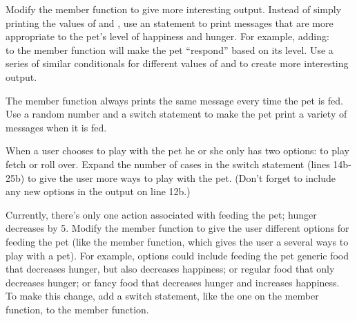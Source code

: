 
Modify the  member function to give more interesting output.  Instead of simply printing the values of  and , use an  statement to print messages that are more appropriate to the pet's level of happiness and hunger.  For example, adding:\\
to the  member function will make the pet ``respond'' based on its  level.  Use a series of similar conditionals for different values of  and  to create more interesting output.


The  member function always prints the same message every time the pet is fed.  Use a random number and a switch statement to make the pet print a variety of messages when it is fed.  


When a user chooses to play with the pet he or she only has two options: to play fetch or roll over.  Expand the number of cases in the switch statement (lines 14b-25b) to give the user more ways to play with the pet.  (Don't forget to include any new options in the output on line 12b.)


Currently, there's only one action associated with feeding the pet; hunger decreases by 5.  Modify the  member function to give the user different options for feeding the pet (like the  member function, which gives the user a several ways to play with a pet).  For example, options could include feeding the pet generic food that decreases hunger, but also decreases happiness; or regular food that only decreases hunger; or fancy food that decreases hunger and increases happiness.  To make this change, add a switch statement, like the one on the  member function, to the  member function.


